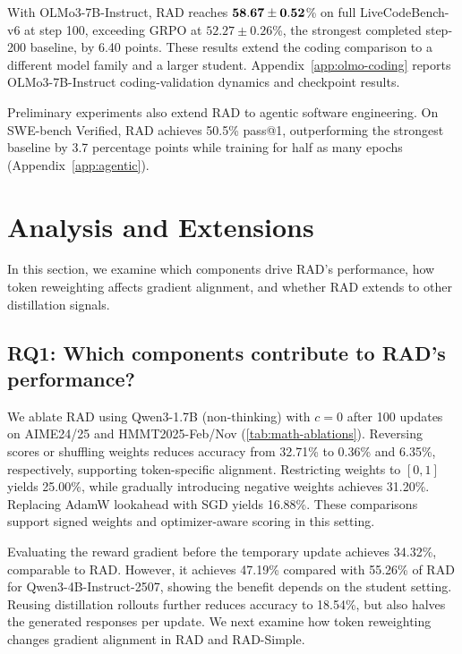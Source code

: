 \documentclass{article} %
\begin{document}
\label{sec:olmo-extension}

With OLMo3-7B-Instruct, RAD reaches \(\bf 58.67\pm0.52\)\% on full
LiveCodeBench-v6 at step 100, exceeding GRPO at \(52.27\pm0.26\)\%,
the strongest completed step-200 baseline, by 6.40 points. These results extend the coding comparison to a
different model family and a larger student.
Appendix~\ref{app:olmo-coding}
reports OLMo3-7B-Instruct coding-validation dynamics and checkpoint
results.

Preliminary experiments also extend RAD to agentic software engineering.
On SWE-bench Verified, RAD achieves 50.5\% pass@1, outperforming the
strongest baseline by 3.7 percentage points while training for half as
many epochs (Appendix~\ref{app:agentic}).

\section{Analysis and Extensions}
\label{sec:analysis-and-extensions}



In this section, we examine which components drive RAD's performance, how token reweighting
affects gradient alignment, and whether RAD extends to other distillation signals.

\subsection{RQ1: Which components contribute to RAD's performance?}
\label{sec:ablations}

We ablate RAD using Qwen3-1.7B (non-thinking) with \(c=0\) after 100 updates on AIME24/25 and HMMT2025-Feb/Nov (\cref{tab:math-ablations}). Reversing scores or shuffling weights reduces accuracy from 32.71\% to 0.36\% and 6.35\%, respectively, supporting token-specific alignment. Restricting weights to \([0,1]\) yields 25.00\%, while gradually introducing negative weights achieves 31.20\%. Replacing AdamW lookahead with SGD yields 16.88\%. These comparisons support signed weights and optimizer-aware scoring in this setting.

Evaluating the reward gradient before the temporary update achieves 34.32\%, comparable to RAD.
However, it achieves 47.19\% compared with 55.26\% of RAD for Qwen3-4B-Instruct-2507, 
showing the benefit depends on the student setting.
Reusing distillation rollouts further reduces accuracy to 18.54\%, but also halves the generated responses per update. We next examine how token reweighting changes gradient alignment in RAD and RAD-Simple.
\end{document}
